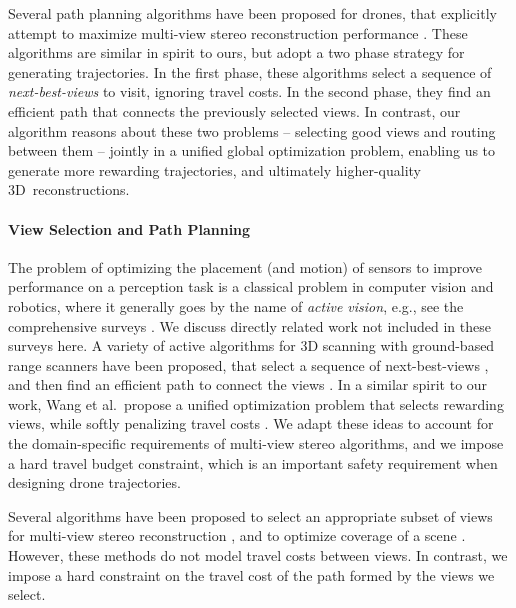 Several path planning algorithms have been proposed for drones, that explicitly attempt to maximize multi-view stereo reconstruction performance \cite{dunn:2009a,hoppe:2012,mostegel:2016,schmid:2012}.
These algorithms are similar in spirit to ours, but adopt a two phase strategy for generating trajectories.
In the first phase, these algorithms select a sequence of \emph{next-best-views} to visit, ignoring travel costs.
In the second phase, they find an efficient path that connects the previously selected views.
In contrast, our algorithm reasons about these two problems -- selecting good views and routing between them -- jointly in a unified global optimization problem, enabling us to generate more rewarding trajectories, and ultimately higher-quality 3D\ reconstructions.

\paragraph{View Selection and Path Planning}
The problem of optimizing the placement (and motion) of sensors to improve performance on a perception task is a classical problem in computer vision and robotics, where it generally goes by the name of \emph{active vision}, e.g., see the comprehensive surveys \cite{chen:2011,scott:2003,tarabanis:1995}.
We discuss directly related work not included in these surveys here.
A variety of active algorithms for 3D scanning with ground-based range scanners have been proposed, that select a sequence of next-best-views \cite{krainin:2011}, and then find an efficient path to connect the views \cite{fan:2016,wu:2014}.
In a similar spirit to our work, Wang et al.~propose a unified optimization problem that selects rewarding views, while softly penalizing travel costs \cite{wang:2007}.
We adapt these ideas to account for the domain-specific requirements of multi-view stereo algorithms, and we impose a hard travel budget constraint, which is an important safety requirement when designing drone trajectories.

Several algorithms have been proposed to select an appropriate subset of views for multi-view stereo reconstruction \cite{dunn:2009b,hornung:2008,mauro:2014b,mauro:2014a}, and to optimize coverage of a scene \cite{ghanem:2015,mavrinac:2013}.
However, these methods do not model travel costs between views.
In contrast, we impose a hard constraint on the travel cost of the path formed by the views we select.

